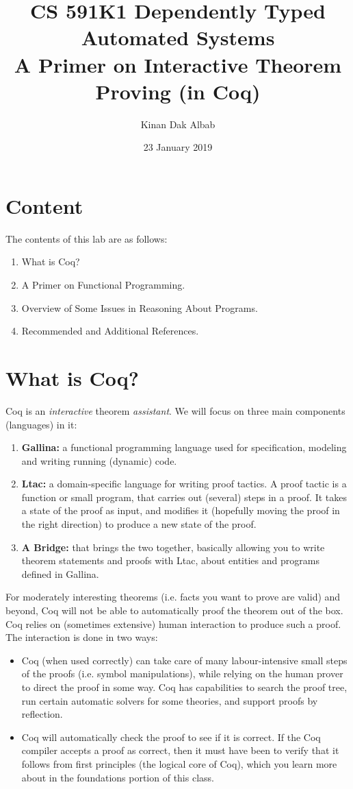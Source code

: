 \documentclass{article}
\title{CS 591K1 Dependently Typed Automated Systems\\
A Primer on Interactive Theorem Proving (in Coq)}
\author{Kinan Dak Albab}
\date{23 January 2019}
\begin{document}
\maketitle

\section {Content}
The contents of this lab are as follows:
\begin{enumerate}
    \item What is Coq?
    \item A Primer on Functional Programming.
    \item Overview of Some Issues in Reasoning About Programs.
    \item Recommended and Additional References.
\end{enumerate}

\section{What is Coq?}
Coq is an \textit{interactive} theorem \textit{assistant}. We will focus on three main components (languages) in it:
\begin{enumerate}
    \item \textbf{Gallina:} a functional programming language used for specification, modeling and writing running (dynamic) code.
    \item \textbf{Ltac:} a domain-specific language for writing proof tactics. A proof tactic is a function or small program, that carries out (several) steps in a proof. It takes a state of the proof as input, and modifies it (hopefully moving the proof in the right direction) to produce a new state of the proof.
    \item \textbf{A Bridge:} that brings the two together, basically allowing you to write theorem statements and proofs with Ltac, about entities and programs defined in Gallina.
\end{enumerate}

For moderately interesting theorems (i.e. facts you want to prove are valid) and beyond, Coq will not be able to automatically proof the theorem out of the box. Coq relies on (sometimes extensive) human interaction to produce such a proof. The interaction is done in two ways:
\begin{itemize}
\item Coq (when used correctly) can take care of many labour-intensive small steps of the proofs (i.e. symbol manipulations), while relying on the human prover to direct the proof in some way. Coq has capabilities to search the proof tree, run certain automatic solvers for some theories, and support proofs by reflection. 
\item Coq will automatically check the proof to see if it is correct. If the Coq compiler accepts a proof as correct, then it must have been to verify that it follows from first principles (the logical core of Coq), which you learn more about in the foundations portion of this class.
\end{itemize}
\end{document}
